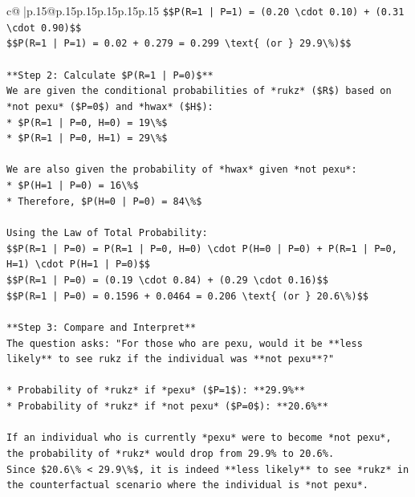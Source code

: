 \documentclass{article}
\begin{document}
{\begin{supertabular}{c@{$\;$}|p{.15\linewidth}@{}p{.15\linewidth}p{.15\linewidth}p{.15\linewidth}p{.15\linewidth}p{.15\linewidth}}
{{{\texttt{\$\$P(R=1 | P=1) = (0.20 \textbackslash{}cdot 0.10) + (0.31 \textbackslash{}cdot 0.90)\$\$} \\
\texttt{\$\$P(R=1 | P=1) = 0.02 + 0.279 = 0.299 \textbackslash{}text\{ (or \} 29.9\textbackslash{}\%)\$\$} \\
\\ 
\texttt{**Step 2: Calculate \$P(R=1 | P=0)\$**} \\
\texttt{We are given the conditional probabilities of *rukz* (\$R\$) based on *not pexu* (\$P=0\$) and *hwax* (\$H\$):} \\
\texttt{*   \$P(R=1 | P=0, H=0) = 19\textbackslash{}\%\$} \\
\texttt{*   \$P(R=1 | P=0, H=1) = 29\textbackslash{}\%\$} \\
\\ 
\texttt{We are also given the probability of *hwax* given *not pexu*:} \\
\texttt{*   \$P(H=1 | P=0) = 16\textbackslash{}\%\$} \\
\texttt{*   Therefore, \$P(H=0 | P=0) = 84\textbackslash{}\%\$} \\
\\ 
\texttt{Using the Law of Total Probability:} \\
\texttt{\$\$P(R=1 | P=0) = P(R=1 | P=0, H=0) \textbackslash{}cdot P(H=0 | P=0) + P(R=1 | P=0, H=1) \textbackslash{}cdot P(H=1 | P=0)\$\$} \\
\texttt{\$\$P(R=1 | P=0) = (0.19 \textbackslash{}cdot 0.84) + (0.29 \textbackslash{}cdot 0.16)\$\$} \\
\texttt{\$\$P(R=1 | P=0) = 0.1596 + 0.0464 = 0.206 \textbackslash{}text\{ (or \} 20.6\textbackslash{}\%)\$\$} \\
\\ 
\texttt{**Step 3: Compare and Interpret**} \\
\texttt{The question asks: "For those who are pexu, would it be **less likely** to see rukz if the individual was **not pexu**?"} \\
\\ 
\texttt{*   Probability of *rukz* if *pexu* (\$P=1\$): **29.9\%**} \\
\texttt{*   Probability of *rukz* if *not pexu* (\$P=0\$): **20.6\%**} \\
\\ 
\texttt{If an individual who is currently *pexu* were to become *not pexu*, the probability of *rukz* would drop from 29.9\% to 20.6\%.} \\
\texttt{Since \$20.6\textbackslash{}\% < 29.9\textbackslash{}\%\$, it is indeed **less likely** to see *rukz* in the counterfactual scenario where the individual is *not pexu*.} \\
}}}
\end{supertabular}}
\end{document}
